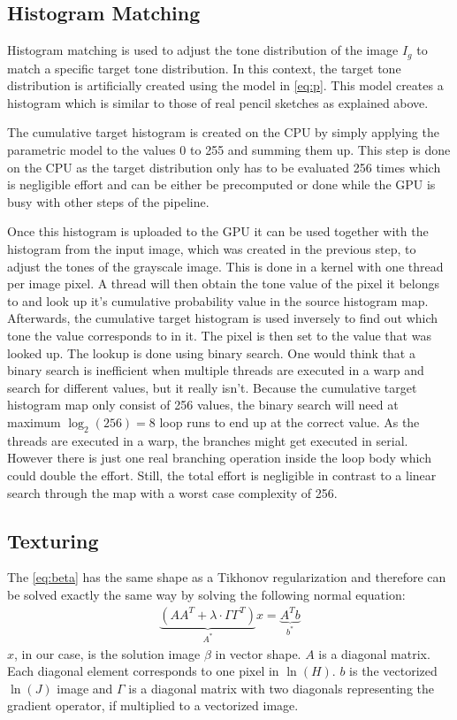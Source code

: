 \subsection{Histogram Matching}
Histogram matching is used to adjust the tone distribution of the 
image $I_g$ to match a specific target tone distribution. In this context, the
target tone distribution is artificially created using the model in
\autoref{eq:p}. This model creates a histogram which is similar to those of real
pencil sketches as explained above.

The cumulative target histogram is created on the CPU by simply applying
the parametric model to the values 0 to 255 and summing them up. This step is done
on the CPU as the target distribution only has to be evaluated 256 times which
is negligible effort and can be either be precomputed or done while the GPU is
busy with other steps of the pipeline.

Once this histogram is uploaded to the GPU it can be used together with
the histogram from the input image, which was created in the previous step, to
adjust the tones of the grayscale image. This is done in a kernel with one
thread per image pixel. A thread will then obtain the tone value of the pixel it
belongs to and look up it's cumulative probability value in the source histogram
map.  Afterwards, the cumulative target histogram is used inversely to find out
which tone the value corresponds to in it. The pixel is then set to the value
that was looked up. The lookup is done using binary search.
One would think that a binary search is inefficient when multiple threads
are executed in a warp and search for different values, but it really isn't.
Because the cumulative target histogram map only consist of 256 values,
the binary search will need at maximum $\log_2(256)=8$ loop runs to end
up at the correct value. As the threads are executed in a warp,
the branches might get executed in serial. However there is just one 
real branching operation inside the loop body which could double the
effort. Still, the total effort is negligible in contrast to a linear search
through the map with a worst case complexity of 256.

\subsection{Texturing}
The \autoref{eq:beta} has the same shape as a Tikhonov regularization and
therefore can be solved exactly the same way by solving the following normal
equation:
\begin{align}
  \underbrace{(A A^T + \lambda \cdot \Gamma \Gamma^T)}_{A^*} x = \underbrace{A^T
  b}_{b^*}
  \label{eq:tikhonov}
\end{align}
$x$, in our case, is the solution image $\beta$ in vector shape. $A$ is a diagonal matrix.
Each diagonal element corresponds to one pixel in $\ln(H)$. $b$ is the
vectorized $\ln(J)$ image and $\Gamma$ is a diagonal matrix with two diagonals
representing the gradient operator, if multiplied to a vectorized image.

